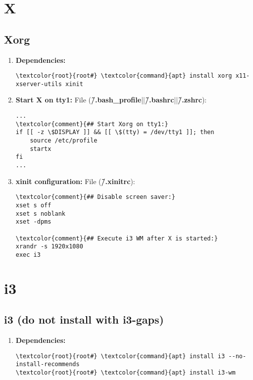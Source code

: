 \documentclass[10pt, a4paper, onecolumn, openany]{book} %
\begin{document}
\chapter{X}
\section{Xorg}
\begin{enumerate}
    \item \textbf{Dependencies:}
\begin{Verbatim}[commandchars=\\\{\}]
\textcolor{root}{root#} \textcolor{command}{apt} install xorg x11-xserver-utils xinit
\end{Verbatim}
    \item \textbf{Start X on tty1:}
\newline File (\textbf{\textcolor{file}{\~/.bash\_profile}}||\textbf{\textcolor{file}{\~/.bashrc}}||\textbf{\textcolor{file}{\~/.zshrc}}):
\begin{Verbatim}[commandchars=\\\{\}]
...
\textcolor{comment}{## Start Xorg on tty1:}
if [[ -z \$DISPLAY ]] && [[ \$(tty) = /dev/tty1 ]]; then
    source /etc/profile
    startx
fi
...
\end{Verbatim}
    \item \textbf{xinit configuration:}
\newline File (\textbf{\textcolor{file}{\~/.xinitrc}}):
\begin{Verbatim}[commandchars=\\\{\}]
\textcolor{comment}{## Disable screen saver:}
xset s off
xset s noblank
xset -dpms

\textcolor{comment}{## Execute i3 WM after X is started:}
xrandr -s 1920x1080
exec i3
\end{Verbatim}
\end{enumerate}
\chapter{i3}
\section{i3 (do not install with i3-gaps)}
\begin{enumerate}
    \item \textbf{Dependencies:}
\begin{Verbatim}[commandchars=\\\{\}]
\textcolor{root}{root#} \textcolor{command}{apt} install i3 --no-install-recommends
\textcolor{root}{root#} \textcolor{command}{apt} install i3-wm
\end{Verbatim}
\end{enumerate}
\end{document}
